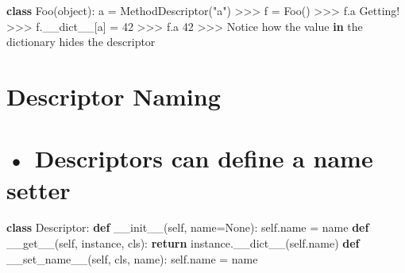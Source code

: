 \documentclass[
  letterpaper,
  DIV=11,
  numbers=noendperiod]{scrreprt}
\newenvironment{Shaded}{\begin{snugshade}}{\end{snugshade}}
\newcommand{\BuiltInTok}[1]{\textcolor[rgb]{0.00,0.23,0.31}{#1}}
\newcommand{\ControlFlowTok}[1]{\textcolor[rgb]{0.00,0.23,0.31}{\textbf{#1}}}
\newcommand{\DecValTok}[1]{\textcolor[rgb]{0.68,0.00,0.00}{#1}}
\newcommand{\FunctionTok}[1]{\textcolor[rgb]{0.28,0.35,0.67}{#1}}
\newcommand{\KeywordTok}[1]{\textcolor[rgb]{0.00,0.23,0.31}{\textbf{#1}}}
\newcommand{\NormalTok}[1]{\textcolor[rgb]{0.00,0.23,0.31}{#1}}
\newcommand{\OperatorTok}[1]{\textcolor[rgb]{0.37,0.37,0.37}{#1}}
\newcommand{\StringTok}[1]{\textcolor[rgb]{0.13,0.47,0.30}{#1}}
\newcommand{\VariableTok}[1]{\textcolor[rgb]{0.07,0.07,0.07}{#1}}
\begin{document}
\begin{Shaded}
\begin{Highlighting}[]
\KeywordTok{class}\NormalTok{ Foo(}\BuiltInTok{object}\NormalTok{):}
\NormalTok{    a }\OperatorTok{=}\NormalTok{ MethodDescriptor(}\StringTok{"a"}\NormalTok{)}
\OperatorTok{\textgreater{}\textgreater{}\textgreater{}}\NormalTok{ f }\OperatorTok{=}\NormalTok{ Foo()}
\OperatorTok{\textgreater{}\textgreater{}\textgreater{}}\NormalTok{ f.a}
\NormalTok{Getting}\OperatorTok{!}
\OperatorTok{\textgreater{}\textgreater{}\textgreater{}}\NormalTok{ f.\_\_dict\_\_[}\StringTok{\textquotesingle{}a\textquotesingle{}}\NormalTok{] }\OperatorTok{=} \DecValTok{42}
\OperatorTok{\textgreater{}\textgreater{}\textgreater{}}\NormalTok{ f.a}
\DecValTok{42}
\OperatorTok{\textgreater{}\textgreater{}\textgreater{}}\NormalTok{ Notice how the value }\KeywordTok{in}\NormalTok{ the dictionary hides the descriptor }
\end{Highlighting}
\end{Shaded}


\chapter{Descriptor Naming}\label{descriptor-naming}


\chapter{• Descriptors can define a name
setter}\label{descriptors-can-define-a-name-setter}

\begin{Shaded}
\begin{Highlighting}[]
\KeywordTok{class}\NormalTok{ Descriptor: }\KeywordTok{def} \FunctionTok{\_\_init\_\_}\NormalTok{(}\VariableTok{self}\NormalTok{, name}\OperatorTok{=}\VariableTok{None}\NormalTok{): }\VariableTok{self}\NormalTok{.name }\OperatorTok{=}\NormalTok{ name }\KeywordTok{def} \FunctionTok{\_\_get\_\_}\NormalTok{(}\VariableTok{self}\NormalTok{, instance, cls): }\ControlFlowTok{return}\NormalTok{ instance.\_\_dict\_\_(}\VariableTok{self}\NormalTok{.name) }\KeywordTok{def} \FunctionTok{\_\_set\_name\_\_}\NormalTok{(}\VariableTok{self}\NormalTok{, cls, name): }\VariableTok{self}\NormalTok{.name }\OperatorTok{=}\NormalTok{ name }
\end{Highlighting}
\end{Shaded}
\end{document}
